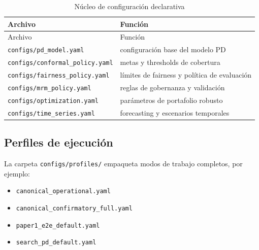 \documentclass[
  spanish,
  11pt,
  letterpaper,
]{scrbook}
\providecommand{\tightlist}{%
  \setlength{\itemsep}{0pt}\setlength{\parskip}{0pt}}
\theoremstyle{plain}
\theoremstyle{remark}
\begin{document}
\begin{longtable}[]{@{}
  >{\raggedright\arraybackslash}p{}
  >{\raggedright\arraybackslash}p{}@{}}
\caption{Núcleo de configuración
declarativa}\label{tbl-config-core}\tabularnewline
\toprule\noalign{}
\begin{minipage}[b]{\linewidth}\raggedright
Archivo
\end{minipage} & \begin{minipage}[b]{\linewidth}\raggedright
Función
\end{minipage} \\
\midrule\noalign{}
\endfirsthead
\toprule\noalign{}
\begin{minipage}[b]{\linewidth}\raggedright
Archivo
\end{minipage} & \begin{minipage}[b]{\linewidth}\raggedright
Función
\end{minipage} \\
\midrule\noalign{}
\endhead
\bottomrule\noalign{}
\endlastfoot
\texttt{configs/pd\_model.yaml} & configuración base del modelo PD \\
\texttt{configs/conformal\_policy.yaml} & metas y thresholds de
cobertura \\
\texttt{configs/fairness\_policy.yaml} & límites de fairness y política
de evaluación \\
\texttt{configs/mrm\_policy.yaml} & reglas de gobernanza y validación \\
\texttt{configs/optimization.yaml} & parámetros de portafolio robusto \\
\texttt{configs/time\_series.yaml} & forecasting y escenarios
temporales \\
\end{longtable}

\subsection{Perfiles de ejecución}\label{perfiles-de-ejecuciuxf3n}

La carpeta \texttt{configs/profiles/} empaqueta modos de trabajo
completos, por ejemplo:

\begin{itemize}
\tightlist
\item
  \texttt{canonical\_operational.yaml}
\item
  \texttt{canonical\_confirmatory\_full.yaml}
\item
  \texttt{paper1\_e2e\_default.yaml}
\item
  \texttt{search\_pd\_default.yaml}
\end{itemize}
\end{document}
